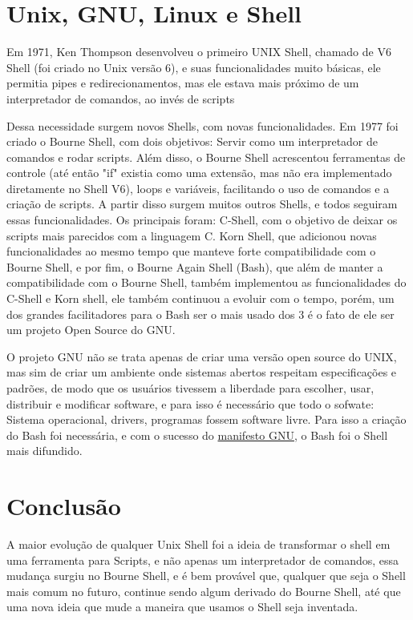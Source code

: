 \documentclass[twoside,twocolumn]{article}
\begin{document}
\section{Unix, GNU, Linux e Shell}
Em 1971, Ken Thompson desenvolveu o primeiro UNIX Shell, chamado de V6 Shell (foi criado no Unix versão 6), e suas funcionalidades muito básicas, ele permitia pipes e redirecionamentos, mas ele estava mais próximo de um interpretador de comandos, ao invés de scripts\par
Dessa necessidade surgem novos Shells, com novas funcionalidades. Em 1977 foi criado o Bourne Shell, com dois objetivos: Servir como um interpretador de comandos e rodar scripts. Além disso, o Bourne Shell acrescentou ferramentas de controle (até então "if" existia como uma extensão, mas não era implementado diretamente no Shell V6), loops e variáveis, facilitando o uso de comandos e a criação de scripts. A partir disso surgem muitos outros Shells, e todos seguiram essas funcionalidades. Os principais foram: C-Shell, com o objetivo de deixar os scripts mais parecidos com a linguagem C. Korn Shell, que adicionou novas funcionalidades ao mesmo tempo que manteve forte compatibilidade com o Bourne Shell, e por fim, o Bourne Again Shell (Bash), que além de manter a compatibilidade com o Bourne Shell, também implementou as funcionalidades do C-Shell e Korn shell, ele também continuou a evoluir com o tempo, porém, um dos grandes facilitadores para o Bash ser o mais usado dos 3 é o fato de ele ser um projeto Open Source do GNU. \par
O projeto GNU não se trata apenas de criar uma versão open source do UNIX, mas sim de criar um ambiente onde sistemas abertos respeitam especificações e padrões, de modo que os usuários tivessem a liberdade para escolher, usar, distribuir e modificar software, e para isso é necessário que todo o sofwate: Sistema operacional, drivers, programas fossem software livre. Para isso a criação do Bash foi necessária, e com o sucesso do \href{https://www.gnu.org/gnu/manifesto.pt-br.html}{manifesto GNU}, o Bash foi o Shell mais difundido.
\section{Conclusão}
A maior evolução de qualquer Unix Shell foi a ideia de transformar o shell em uma ferramenta para Scripts, e não apenas um interpretador de comandos, essa mudança surgiu no Bourne Shell, e é bem provável que, qualquer que seja o Shell mais comum no futuro, continue sendo algum derivado do Bourne Shell, até que uma nova ideia que mude a maneira que usamos o Shell seja inventada.\par
\end{document}
